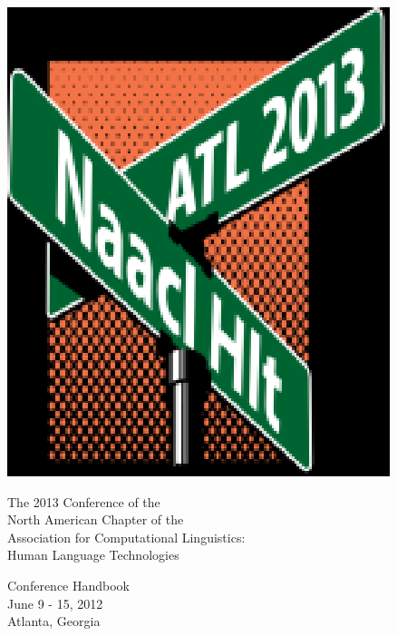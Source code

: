 \begin{center}
\includegraphics[clip=true]{content/fmatter/NaACL2013logo.eps}
\vspace{5em}

The 2013 Conference of the \\
North American Chapter of the \\
Association for Computational Linguistics: \\
Human Language Technologies
\vspace{5em}

{\huge Conference Handbook}\vspace{3em}\\

{\large June 9 - 15, 2012\\
Atlanta, Georgia\\}
\vspace{2em}
\vfill

\starsemstamp
\end{center}
\newpage
